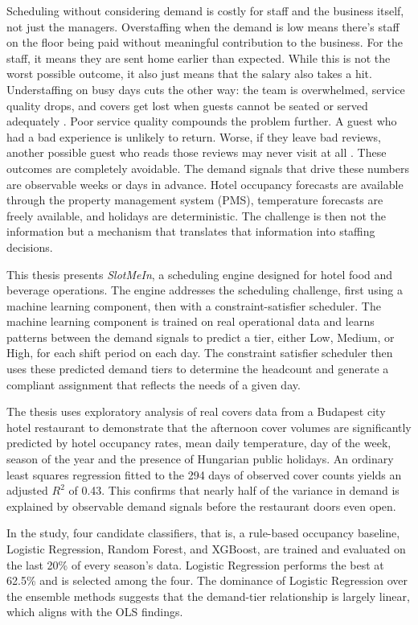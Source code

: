 \documentclass[12pt,a4paper,oneside]{article}
\begin{document}
Scheduling without considering demand is costly for staff and the business itself,  not just the managers.  Overstaffing when the demand is low means there's staff on the floor being paid without meaningful contribution to the business. For the staff, it means they are sent home earlier than expected. While this is not the worst possible outcome, it also just means that the salary also takes a hit.  Understaffing on busy days cuts the other way: the team is overwhelmed, service quality drops, and covers get lost when guests cannot be seated or served adequately \citep{choi2009}. Poor service quality compounds the problem further. A guest who had a bad experience is unlikely to return. Worse, if they leave bad reviews, another possible guest who reads those reviews may never visit at all \citep{sparks2011}. These outcomes are completely avoidable. The demand signals that drive these numbers are observable weeks or days in advance.  Hotel occupancy forecasts are available through the property management system (PMS), temperature forecasts are freely available, and holidays are deterministic. The challenge is then not the information but a mechanism that translates that information into staffing decisions.

This thesis presents \textit{SlotMeIn}, a scheduling engine designed for hotel food and beverage operations. The engine addresses the scheduling challenge, first using a machine learning component, then with a constraint-satisfier scheduler. The machine learning component is trained on real operational data and learns patterns between the demand signals to predict a tier, either Low, Medium, or High, for each shift period on each day. The constraint satisfier scheduler then uses these predicted demand tiers to determine the headcount and generate a compliant assignment that reflects the needs of a given day.

The thesis uses exploratory analysis of real covers data from a Budapest city hotel restaurant to demonstrate that the afternoon cover volumes are significantly predicted by hotel occupancy rates, mean daily temperature, day of the week, season of the year and the presence of Hungarian public holidays. An ordinary least squares regression fitted to the 294 days of observed cover counts  yields an adjusted $R^2$ of 0.43. This confirms that nearly half of the variance in demand is explained by observable demand signals before the restaurant doors even open.

In the study, four candidate classifiers, that is, a rule-based occupancy baseline, Logistic Regression, Random Forest, and XGBoost, are trained and evaluated on the last 20\% of every season's data. Logistic Regression performs the best at 62.5\% and is selected among the four. The dominance of Logistic Regression over the ensemble methods suggests that the demand-tier relationship is largely linear, which aligns with the OLS findings.
\end{document}
